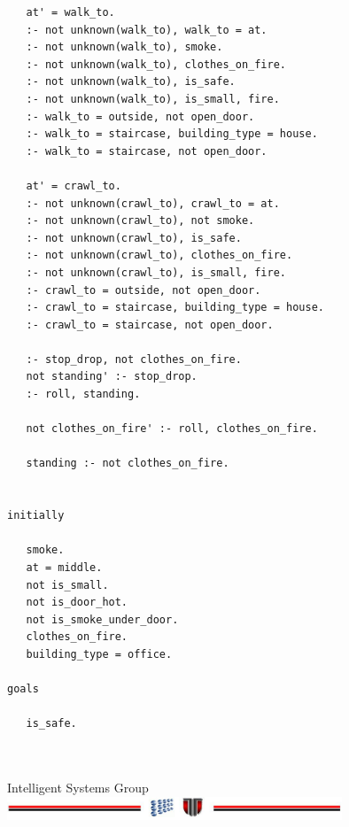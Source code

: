 \documentclass[a4paper,12pt]{report}
\begin{document}
\begin{verbatim}
   at' = walk_to.
   :- not unknown(walk_to), walk_to = at.
   :- not unknown(walk_to), smoke.
   :- not unknown(walk_to), clothes_on_fire.
   :- not unknown(walk_to), is_safe.
   :- not unknown(walk_to), is_small, fire.
   :- walk_to = outside, not open_door. 
   :- walk_to = staircase, building_type = house.
   :- walk_to = staircase, not open_door.
          
   at' = crawl_to.
   :- not unknown(crawl_to), crawl_to = at.
   :- not unknown(crawl_to), not smoke.
   :- not unknown(crawl_to), is_safe.
   :- not unknown(crawl_to), clothes_on_fire.
   :- not unknown(crawl_to), is_small, fire.
   :- crawl_to = outside, not open_door.
   :- crawl_to = staircase, building_type = house.
   :- crawl_to = staircase, not open_door.

   :- stop_drop, not clothes_on_fire.
   not standing' :- stop_drop.
   :- roll, standing.
        
   not clothes_on_fire' :- roll, clothes_on_fire.

   standing :- not clothes_on_fire.	


initially

   smoke.
   at = middle.
   not is_small.
   not is_door_hot.
   not is_smoke_under_door.
   clothes_on_fire.
   building_type = office.

goals

   is_safe.
	
	
\end{verbatim}







\vspace{2cm}
\begin{center}
Intelligent Systems Group\\
\includegraphics[width=10cm]{fig/footer}
\end{center}
\end{document}
